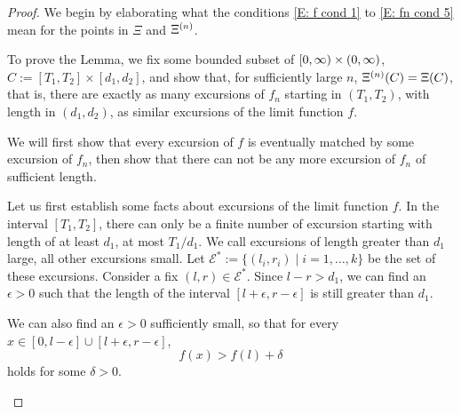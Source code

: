 \begin{proof}
We begin by elaborating what the conditions
\eqref{E: f cond 1} to \eqref{E: fn cond 5}
mean for the points in
$\Xi$ and $\Xi^{(n)}$.

To prove the Lemma, 
we fix some bounded subset of
$[0, \infty) \times (0, \infty)$,
$C := [T_1, T_2] \times [d_1, d_2]$,
and show that, for sufficiently large $n$,
$\Xi^{(n)}(C) = \Xi(C)$,
that is,
there are exactly as many excursions of $f_n$ starting in
$(T_1, T_2)$, 
with length in $(d_1, d_2)$,
as similar excursions of the limit function $f$.

We will first show that every excursion of $f$ is eventually matched by some excursion of $f_n$,
then show that there can not be any more excursion of $f_n$ of sufficient length.


\begin{proofpart} \label{PP: Lemma 7 1}

Let us first establish some facts about excursions of the limit function $f$.
In the interval $[T_1, T_2]$,
there can only be a finite number of excursion starting with length of at least $d_1$,
at most $T_1/d_1$.
We call excursions of length greater than $d_1$ large, all other excursions small.
Let
$ \mathcal{E}^* := \{ (l_i, r_i) \; | \; i=1, \dots, k \} $
be the set of these excursions.
Consider a fix
$(l,r) \in \mathcal{E}^*$.
Since $l-r > d_1$,
we can find an $\epsilon > 0$
such that the length of the interval
$[l+\epsilon, r-\epsilon]$
is still greater than $d_1$.

We can also find an $\epsilon > 0$ sufficiently small,
so that for every
$x \in [0, l-\epsilon] \cup [l+\epsilon, r-\epsilon]$,
\begin{equation} \label{E: fx > fl + delta}
f(x) > f(l) + \delta
\end{equation}
holds for some $\delta > 0$.


\end{proofpart}
\end{proof}
